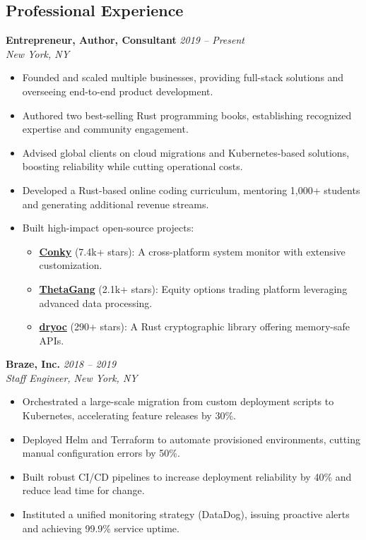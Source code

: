 \documentclass[margin,line]{resume}
\begin{document}
\begin{resume}
\vspace{10pt}

\section{Professional Experience}

\textbf{Entrepreneur, Author, Consultant} \hfill \textit{2019 -- Present}\\
\textit{New York, NY}
\begin{itemize}[leftmargin=0.5cm]
    \item Founded and scaled multiple businesses, providing full-stack solutions and overseeing end-to-end product development.
    \item Authored two best-selling Rust programming books, establishing recognized expertise and community engagement.
    \item Advised global clients on cloud migrations and Kubernetes-based solutions, boosting reliability while cutting operational costs.
    \item Developed a Rust-based online coding curriculum, mentoring 1,000+ students and generating additional revenue streams.
    \item Built high-impact open-source projects:
        \begin{itemize}
            \item \href{https://github.com/brndnmtthws/conky/}{\textbf{Conky}} (7.4k+ stars): A cross-platform system monitor with extensive customization.
            \item \href{https://github.com/brndnmtthws/thetagang/}{\textbf{ThetaGang}} (2.1k+ stars): Equity options trading platform leveraging advanced data processing.
            \item \href{https://github.com/brndnmtthws/dryoc/}{\textbf{dryoc}} (290+ stars): A Rust cryptographic library offering memory-safe APIs.
        \end{itemize}
\end{itemize}

\textbf{Braze, Inc.} \hfill \textit{2018 -- 2019}\\
\textit{Staff Engineer, New York, NY}
\begin{itemize}[leftmargin=0.5cm]
    \item Orchestrated a large-scale migration from custom deployment scripts to Kubernetes, accelerating feature releases by 30\%.
    \item Deployed Helm and Terraform to automate provisioned environments, cutting manual configuration errors by 50\%.
    \item Built robust CI/CD pipelines to increase deployment reliability by 40\% and reduce lead time for change.
    \item Instituted a unified monitoring strategy (DataDog), issuing proactive alerts and achieving 99.9\% service uptime.
\end{itemize}


\end{resume}
\end{document}
